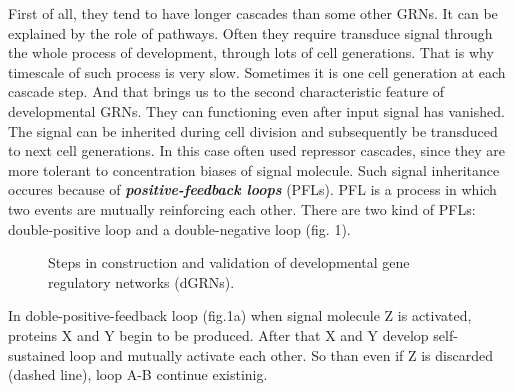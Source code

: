 \documentclass[a4paper, oneside]{report}
\begin{document}
First of all, they tend to have longer cascades than some other GRNs.
It can be explained by the role of pathways.
Often they require transduce signal through the whole process of development, through lots of cell generations.
That is why timescale of such process is very slow.
Sometimes it is one cell generation at each cascade step.
And that brings us to the second characteristic feature of developmental GRNs.
They can functioning even after input signal has vanished.
The signal can be inherited during cell division and subsequently be transduced to next cell generations.
In this case often used repressor cascades, since they are more tolerant to concentration biases of signal molecule.
Such signal inheritance occures because of \textbf{\textit{positive-feedback loops}} (PFLs).
PFL is a process in which two events are mutually reinforcing each other.
There are two kind of PFLs: double-positive loop and a double-negative loop (fig. 1).

\begin{figure}[h]
	\caption{Steps in construction and validation of developmental gene regulatory networks (dGRNs).}
\end{figure}

In doble-positive-feedback loop (fig.1a) when signal molecule Z is activated, proteins X and Y begin to be produced. 
After that X and Y develop self-sustained loop and mutually activate each other.
So than even if Z is discarded (dashed line), loop A-B continue existinig.
\end{document}
